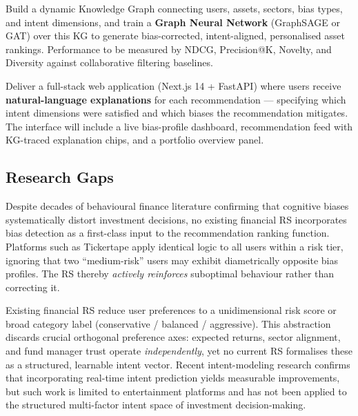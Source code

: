 \documentclass[12pt, a4paper]{article}
\begin{document}
\begin{tcolorbox}[objbox, title={Objective 3 --- Knowledge Graph-Augmented Recommendation}]
Build a dynamic Knowledge Graph connecting users, assets, sectors, bias types, and intent
dimensions, and train a \textbf{Graph Neural Network} (GraphSAGE or GAT) over this KG to
generate bias-corrected, intent-aligned, personalised asset rankings. Performance to be
measured by NDCG, Precision@K, Novelty, and Diversity against collaborative filtering
baselines.
\end{tcolorbox}

\begin{tcolorbox}[objbox, title={Objective 4 --- Explainable Web Interface}]
Deliver a full-stack web application (Next.js 14 + FastAPI) where users receive
\textbf{natural-language explanations} for each recommendation --- specifying which intent
dimensions were satisfied and which biases the recommendation mitigates. The interface
will include a live bias-profile dashboard, recommendation feed with KG-traced explanation
chips, and a portfolio overview panel.
\end{tcolorbox}

\subsection{Research Gaps}

\begin{tcolorbox}[gapbox, title={\faSearch\ Gap 1 --- Behavioral Biases Absent from RS Pipelines}]
Despite decades of behavioural finance literature confirming that cognitive biases
systematically distort investment decisions, no existing financial RS incorporates bias
detection as a first-class input to the recommendation ranking function. Platforms such
as Tickertape apply identical logic to all users within a risk tier, ignoring that two
``medium-risk'' users may exhibit diametrically opposite bias profiles. The RS thereby
\textit{actively reinforces} suboptimal behaviour rather than correcting it.
\end{tcolorbox}

\begin{tcolorbox}[gapbox, title={\faDatabase\ Gap 2 --- Collapse of Multi-Dimensional Investment Intent}]
Existing financial RS reduce user preferences to a unidimensional risk score or broad
category label (conservative / balanced / aggressive). This abstraction discards crucial
orthogonal preference axes: expected returns, sector alignment, and fund manager trust
operate \textit{independently}, yet no current RS formalises these as a structured,
learnable intent vector. Recent intent-modeling research confirms that incorporating
real-time intent prediction yields measurable improvements, but such work is limited to
entertainment platforms and has not been applied to the structured multi-factor intent
space of investment decision-making.
\end{tcolorbox}
\end{document}
